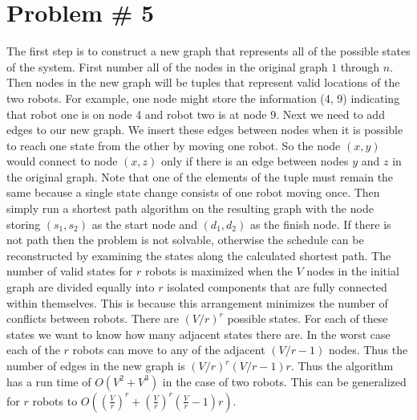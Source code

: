 \documentclass{article}
\begin{document}
\section*{Problem \# 5}
The first step is to construct a new graph that represents all of the possible states of the system. First number all of the nodes in the original graph $1$ through $n$. Then nodes in the new graph will be tuples that represent valid locations of the two robots. For example, one node might store the information (4, 9) indicating that robot one is on node 4 and robot two is at node 9. Next we need to add edges to our new graph. We insert these edges between nodes when it is possible to reach one state from the other by moving one robot. So the node $(x, y)$ would connect to node $(x, z)$ only if there is an edge between nodes $y$ and $z$ in the original graph. Note that one of the elements of the tuple must remain the same because a single state change consists of one robot moving once. Then simply run a shortest path algorithm on the resulting graph with the node storing $(s_1, s_2)$ as the start node and $(d_1, d_2)$ as the finish node. If there is not path then the problem is not solvable, otherwise the schedule can be reconstructed by examining the states along the calculated shortest path. The number of valid states for $r$ robots is maximized when the $V$ nodes in the initial graph are divided equally into $r$ isolated components that are fully connected within themselves. This is because this arrangement minimizes the number of conflicts between robots. There are $(V/r)^r$ possible states. For each of these states we want to know how many adjacent states there are. In the worst case each of the $r$ robots can move to any of the adjacent $(V/r - 1)$ nodes. Thus the number of edges in the new graph is $(V/r)^r(V/r - 1)r$. Thus the algorithm has a run time of $O(V^2 + V^3)$ in the case of two robots. This can be generalized for $r$ robots to $O\left(\left(\frac{V}{r}\right)^r + \left(\frac{V}{r}\right)^r\left(\frac{V}{r} - 1\right)r\right)$. 
\end{document}
